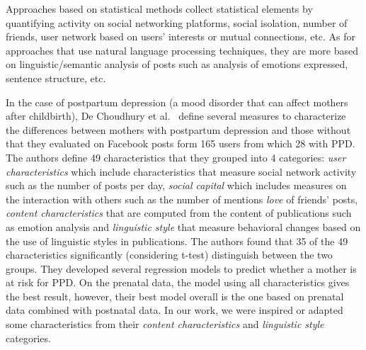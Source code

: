 \documentclass[graybox]{svmult}
\begin{document}
Approaches based on statistical methods collect statistical elements by quantifying activity on social networking platforms, social isolation, number of friends, user network based on users' interests or mutual connections, etc. As for approaches that use natural language processing techniques, they are more based on linguistic/semantic analysis of posts such as analysis of emotions expressed, sentence structure, etc.


In the case of postpartum depression (a mood disorder that can affect mothers after childbirth), De Choudhury et al.~\cite{ChoudhuryCHH14} define several measures to characterize the differences between mothers with postpartum depression  and those without that they evaluated on  Facebook posts form 165 users from which 28 with PPD.  The authors define 49 characteristics that they grouped into 4 categories: \textit{user characteristics} which include characteristics that measure social network activity such as the number of posts per day, \textit{social capital} which includes measures on the interaction with others such as the number of mentions \textit{love} of friends' posts, \textit{content characteristics}  that are computed from the content of publications such as emotion analysis and \textit{linguistic style} that measure behavioral changes based on the use of linguistic styles in publications. The authors found that 35 of the 49 characteristics significantly (considering t-test) distinguish between the two groups. They developed several regression models to predict whether a mother is at risk for PPD. On the prenatal data, the model using all characteristics gives the best result, however, their best model overall is the one based on prenatal data combined with postnatal data. In our work, we were inspired or adapted some characteristics from their  \textit{content characteristics} and \textit{linguistic style} categories.
\end{document}
